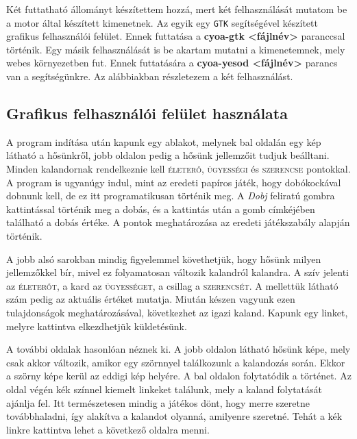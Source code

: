 \documentclass[12pt,a4paper,oneside]{report}
\newcommand{\stat}{\textsc}
\newcommand{\proglang}{\texttt}
\begin{document}
      Két futtatható állományt készítettem hozzá, mert két
      felhasználását mutatom be a motor által készített kimenetnek. Az
      egyik egy \proglang{GTK} segítségével készített grafikus felhasználói
      felület. Ennek futtatása a {\bf cyoa-gtk <fájlnév>} paranccsal
      történik. Egy másik felhasználását is be akartam mutatni a
      kimenetemnek, mely webes környezetben fut. Ennek futtatására
      a {\bf cyoa-yesod <fájlnév>} parancs van a segítségünkre. Az
      alábbiakban részletezem a két felhasználást.

      \subsection{Graf{}ikus felhasználói felület használata}
        A program indítása után kapunk egy ablakot, melynek bal
        oldalán egy kép látható a hősünkről, jobb oldalon pedig a
        hősünk jellemzőit tudjuk beálltani. Minden kalandornak
        rendelkeznie kell \stat{életerő}, \stat{ügyességi} és
        \stat{szerencse} pontokkal. A program is ugyanúgy indul, mint
        az eredeti papíros játék, hogy dobókockával dobnunk kell, de
        ez itt programatikusan történik meg. A \emph{Dobj} feliratú gombra
        kattintással történik meg a dobás, és a kattintás után a gomb
        címkéjében található a dobás értéke. A pontok meghatározása az
        eredeti játékszabály alapján történik.

        A jobb alsó sarokban mindig figyelemmel követhetjük, hogy
        hősünk milyen jellemzőkkel bír, mivel ez folyamatosan változik
        kalandról kalandra. A szív jelenti az \stat{életerőt}, a kard
        az \stat{ügyességet}, a csillag a \stat{szerencsét}. A
        mellettük látható szám pedig az aktuális értéket
        mutatja. Miután készen vagyunk ezen tulajdonságok
        meghatározásával, következhet az igazi kaland. Kapunk egy
        linket, melyre kattintva elkezdhetjük küldetésünk.

        A további oldalak hasonlóan néznek ki. A jobb oldalon látható
        hősünk képe, mely csak akkor változik, amikor egy szörnnyel
        találkozunk a kalandozás során. Ekkor a szörny képe kerül az
        eddigi kép helyére. A bal oldalon folytatódik a
        történet. Az oldal végén kék színnel kiemelt linkeket
        találunk, mely a kaland folytatását ajánlja fel. Itt
        természetesen mindig a játékos dönt, hogy merre szeretne
        továbbhaladni, így alakítva a kalandot olyanná, amilyenre
        szeretné. Tehát a kék linkre kattintva lehet a következő
        oldalra menni.
\end{document}
